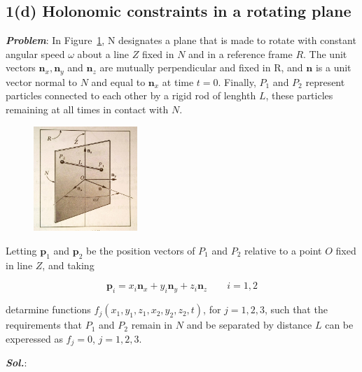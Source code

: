 \subsection{1(d) Holonomic constraints in a rotating plane}
\textbf{\textit{Problem}}: In Figure~\ref{1_d}, N designates a plane that is made to rotate with constant angular speed $\omega$ about a line $Z$ fixed in $N$ and in a reference frame $R$. The unit vectors $\pmb n_x, \pmb n_y$ and  $\pmb n_z$ are mutually perpendicular and fixed in R, and $\pmb n$ is a unit vector normal to $N$ and equal to $\pmb n_x$ at time $t=0$. Finally, $P_1$ and $P_2$ represent particles connected to each other by a rigid rod of lenghth $L$, these particles remaining at all times in contact with $N$.

\begin{figure}[H]
    \centering
    \includegraphics[width = 0.35\textwidth, height = 0.3\textwidth]{figs/ProbSet_1/1_d.jpg}
    \caption{}
    \label{1_d}
\end{figure}


Letting $\pmb p_1$ and $\pmb p_2$ be the position vectors of $P_1$ and $P_2$ relative to a point $O$ fixed in line $Z$, and taking

$$\pmb p_i = x_i \pmb n_x + y_i \pmb n_y + z_i \pmb n_z \qquad i = 1, 2$$

detarmine functions $f_j(x_1, y_1, z_1, x_2, y_2, z_2, t)$, for $j=1, 2, 3$, such that the requirements that $P_1$ and $P_2$ remain in $N$ and be separated by distance $L$ can be experessed as $f_j = 0$, $j = 1, 2, 3$.

\textbf{\textit{Sol.}}:

